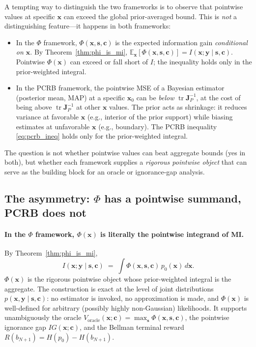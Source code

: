 \documentclass[11pt,a4paper]{article}
\newcommand{\E}{\mathbb{E}}
\newcommand{\tr}{\operatorname{tr}}
\begin{document}
A tempting way to distinguish the two frameworks is to observe that pointwise values at specific $\bm{x}$ can exceed the global prior-averaged bound.  This is \emph{not} a distinguishing feature---it happens in both frameworks:

\begin{itemize}[nosep, leftmargin=2em]
  \item In the $\Phi$ framework, $\Phi(\bm{x}, \bm{s}, \bm{c})$ is the expected information gain \emph{conditional on $\bm{x}$}.  By Theorem~\ref{thm:phi_is_mi}, $\E_{\bm{x}}[\Phi(\bm{x},\bm{s},\bm{c})] = I(\bm{x};\bm{y}\mid\bm{s},\bm{c})$.  Pointwise $\Phi(\bm{x})$ can exceed or fall short of $I$; the inequality holds only in the prior-weighted integral.
  \item In the PCRB framework, the pointwise MSE of a Bayesian estimator (posterior mean, MAP) at a specific $\bm{x}_0$ can be \emph{below} $\tr \bm{J}_P^{-1}$, at the cost of being above $\tr \bm{J}_P^{-1}$ at other $\bm{x}$ values.  The prior acts as shrinkage: it reduces variance at favorable $\bm{x}$ (e.g., interior of the prior support) while biasing estimates at unfavorable $\bm{x}$ (e.g., boundary).  The PCRB inequality \eqref{eq:pcrb_ineq} holds only for the prior-weighted integral.
\end{itemize}

The question is not whether pointwise values can beat aggregate bounds (yes in both), but whether each framework supplies a \emph{rigorous pointwise object} that can serve as the building block for an oracle or ignorance-gap analysis.

\subsection{The asymmetry: \texorpdfstring{$\Phi$}{Phi} has a pointwise summand, PCRB does not}
\label{subsec:asymmetry}

\paragraph{In the $\Phi$ framework, $\Phi(\bm{x})$ is literally the pointwise integrand of MI.}  By Theorem~\ref{thm:phi_is_mi},
\begin{equation}
  I(\bm{x};\bm{y}\mid\bm{s},\bm{c}) \;=\; \int \Phi(\bm{x}, \bm{s}, \bm{c})\, p_0(\bm{x})\, d\bm{x}.
\end{equation}
$\Phi(\bm{x})$ is the rigorous pointwise object whose prior-weighted integral is the aggregate.  The construction is exact at the level of joint distributions $p(\bm{x}, \bm{y} \mid \bm{s}, \bm{c})$: no estimator is invoked, no approximation is made, and $\Phi(\bm{x})$ is well-defined for arbitrary (possibly highly non-Gaussian) likelihoods.  It supports unambiguously the oracle $V_{\mathrm{oracle}}(\bm{x};\bm{c}) = \max_{\bm{s}} \Phi(\bm{x}, \bm{s}, \bm{c})$, the pointwise ignorance gap $IG(\bm{x};\bm{c})$, and the Bellman terminal reward $R(b_{N+1}) = H(p_0) - H(b_{N+1})$.
\end{document}
